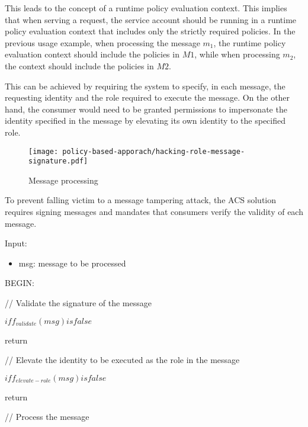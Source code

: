 \vspace{15pt}

This leads to the concept of a runtime policy evaluation context. This implies that when serving a request, the service account should be running in a runtime policy evaluation context that includes only the strictly required policies. 
In the previous usage example, when processing the message $m_1$, the runtime policy evaluation context should include the policies in $M1$, while when processing $m_2$, the context should include the policies in $M2$.

This can be achieved by requiring the system to specify, in each message, the requesting identity and the role required to execute the message. On the other hand, the consumer would need to be granted permissions to impersonate the identity specified in the message by elevating its own identity to the specified role.

\begin{figure}[h]
    \centering
    \texttt{[image: policy-based-apporach/hacking-role-message-signature.pdf]}
    \caption{Message processing}
    \label{fig:hacking-role-message-signature}
\end{figure}

To prevent falling victim to a message tampering attack, the ACS solution requires signing messages and mandates that consumers verify the validity of each message.

\begin{boxF}
    \begin{definition}
        Input:
        \begin{itemize}
            \item msg: message to be processed
        \end{itemize}

        BEGIN:

            \hspace{2pt} // Validate the signature of the message

            \hspace{2pt} $if f_{validate}(msg) is false$
            
            \hspace{10pt} return

            \hspace{2pt} // Elevate the identity to be executed as the role in the message

            \hspace{2pt} $if f_{elevate-role}(msg) is false$
            
            \hspace{10pt} return

            \hspace{2pt} // Process the message
        \label{definition:message-processing}
    \end{definition}
\end{boxF}

